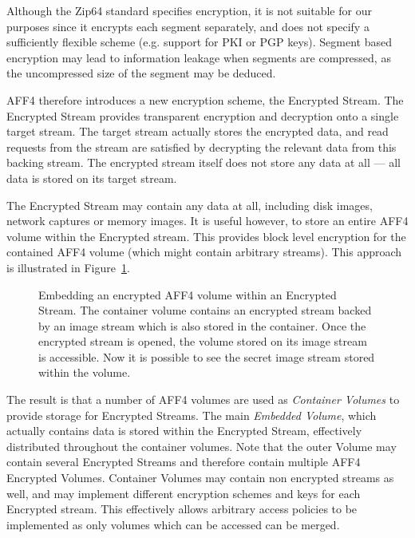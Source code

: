 \documentclass[10pt, conference]{IEEEtran}
\begin{document}
{{Although the Zip64 standard specifies encryption, it is not suitable
for our purposes since it encrypts each segment separately, and does
not specify a sufficiently flexible scheme (e.g. support for PKI or
PGP keys). Segment based encryption may lead to information leakage
when segments are compressed, as the uncompressed size of the segment
may be deduced.

AFF4 therefore introduces a new encryption scheme, the Encrypted
Stream.  The Encrypted Stream provides transparent encryption and
decryption onto a single target stream. The target stream actually
stores the encrypted data, and read requests from the stream are
satisfied by decrypting the relevant data from this backing
stream. The encrypted stream itself does not store any data at all ---
all data is stored on its target stream.

The Encrypted Stream may contain any data at all, including disk
images, network captures or memory images. It is useful however, to
store an entire AFF4 volume within the Encrypted stream. This provides
block level encryption for the contained AFF4 volume (which might
contain arbitrary streams). This approach is illustrated in
Figure~\ref{crypted_fif}.

\begin{figure}[tb]
  \begin{center}
  \mbox{\columnwidth {}}

  \caption{Embedding an encrypted AFF4 volume within an Encrypted
  Stream. The container volume contains an encrypted stream backed by
  an image stream which is also stored in the container. Once the
  encrypted stream is opened, the volume stored on its image stream is
  accessible. Now it is possible to see the secret image stream stored
  within the volume.}

  \label{crypted_fif}
  \end{center}
\end{figure}

The result is that a number of AFF4 volumes are used as {\em Container
Volumes} to provide storage for Encrypted Streams. The main {\em
Embedded Volume}, which actually contains data is stored within the
Encrypted Stream, effectively distributed throughout the container
volumes. Note that the outer Volume may contain several Encrypted
Streams and therefore contain multiple AFF4 Encrypted
Volumes. Container Volumes may contain non encrypted streams as well,
and may implement different encryption schemes and keys for each
Encrypted stream. This effectively allows arbitrary access policies to
be implemented as only volumes which can be accessed can be merged.

}}
\end{document}
